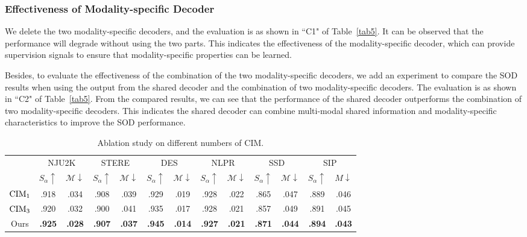 \documentclass[10pt,twocolumn,letterpaper]{article}
\begin{document}
\subsubsection{Effectiveness of Modality-specific Decoder}

We delete the two modality-specific decoders, and the evaluation is as shown in ``C1" of Table~\ref{tab5}. It can be observed that the performance will degrade without using the two parts. This indicates the effectiveness of the modality-specific decoder, which can provide supervision signals to ensure that modality-specific properties can be learned.

Besides, to evaluate the effectiveness of the combination of the two modality-specific decoders, we add an experiment to compare the SOD results when using the output from the shared decoder and the combination of two modality-specific decoders. The evaluation is as shown in ``C2" of Table~\ref{tab5}. From the compared results, we can see that the performance of the shared decoder outperforms the combination of two modality-specific decoders. This indicates the shared decoder can combine multi-modal shared information and modality-specific characteristics to improve the SOD performance.

\begin{table}[t!]
  \centering
  \renewcommand{\arraystretch}{1.2}
  \renewcommand{\tabcolsep}{0.5mm}
  \caption{Ablation study on different numbers of CIM.
  } \scriptsize
  \begin{tabular}{c|cc|cc|cc|cc|cc|cc}
  \hline


    &\multicolumn{2}{c|}{NJU2K}
    &\multicolumn{2}{c|}{STERE}
    &\multicolumn{2}{c|}{DES}
    &\multicolumn{2}{c|}{NLPR}
    &\multicolumn{2}{c|}{SSD}
    &\multicolumn{2}{c}{SIP}\\


    &$S_{\alpha}\uparrow$   &$\mathcal{M}\downarrow$
    &$S_{\alpha}\uparrow$    &$\mathcal{M}\downarrow$
    &$S_{\alpha}\uparrow$    &$\mathcal{M}\downarrow$
    &$S_{\alpha}\uparrow$    &$\mathcal{M}\downarrow$
    &$S_{\alpha}\uparrow$    &$\mathcal{M}\downarrow$
    &$S_{\alpha}\uparrow$    &$M\downarrow$ \\


    \hline

    $\textup{CIM}_1$
    & .918   & .034
    & .908   & .039
    & .929   & .019
    & .928   & .022
    & .865   & .047
    & .889   & .046 	\\

    $\textup{CIM}_3$
    & .920   & .032
    & .900   & .041
    & .935   & .017
    & .928   & .021
    & .857   & .049
    & .891   & .045 	\\

    Ours
    & \textbf{.925}   & \textbf{.028}
    & \textbf{.907}   & \textbf{.037}
    & \textbf{.945}   & \textbf{.014}
    & \textbf{.927}   & \textbf{.021}
    & \textbf{.871}   & \textbf{.044}
    & \textbf{.894}   & \textbf{.043} 	\\

  \hline
  \end{tabular}\label{tab6}
\end{table}
\end{document}
